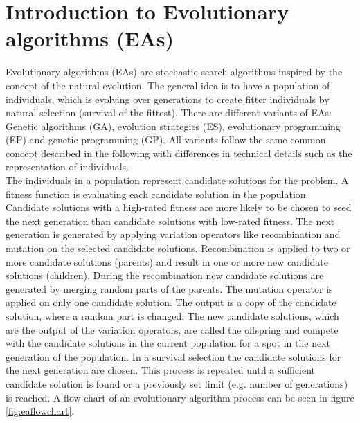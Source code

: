 \newpage
\section{Introduction to Evolutionary algorithms (EAs)}
Evolutionary algorithms (EAs) are stochastic search algorithms inspired by the concept of the natural evolution. The general idea is to have a population of individuals, which is evolving over generations to create fitter individuals by natural selection (survival of the fittest). There are different variants of EAs: Genetic algorithms (GA), evolution strategies (ES), evolutionary programming (EP) and genetic programming (GP). All variants follow the same common concept described in the following with differences in technical details such as the representation of individuals\cite{Eiben}.\\
The individuals in a population represent candidate solutions for the problem. A fitness function is evaluating each candidate solution in the population. Candidate solutions with a high-rated fitness are more likely to be chosen to seed the next generation than candidate solutions with low-rated fitness. The next generation is generated by applying variation operators like recombination and mutation on the selected candidate solutions. Recombination is applied to two or more candidate solutions (parents) and result in one or more new candidate solutions (children). During the recombination new candidate solutions are generated by merging random parts of the parents. The mutation operator is applied on only one candidate solution. The output is a copy of the candidate solution, where a random part is changed. The new candidate solutions, which are the output of the variation operators, are called the offspring and compete with the candidate solutions in the current population for a spot in the next generation of the population. In a survival selection the candidate solutions for the next generation are chosen. This process is repeated until a sufficient candidate solution is found or a previously set limit (e.g. number of generations) is reached. A flow chart of an evolutionary algorithm process can be seen in figure \ref{fig:eaflowchart}.\\
